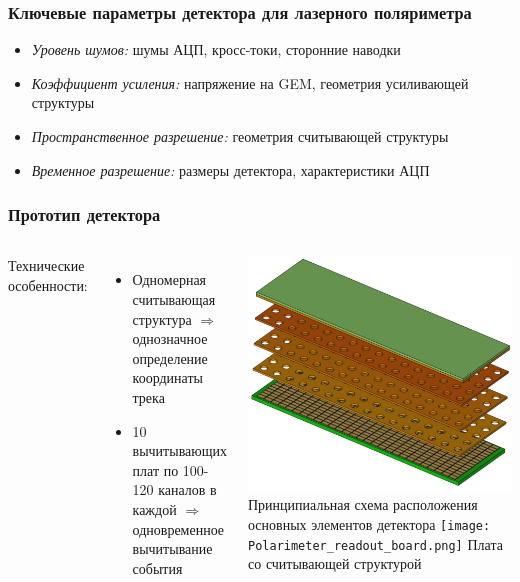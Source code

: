 \documentclass[14pt]{beamer}
\begin{document}
\begin{frame}[t]
\frametitle{Ключевые параметры детектора для лазерного поляриметра}
		\begin{itemize}
				\item \textit{Уровень шумов:} шумы АЦП, кросс-токи, сторонние наводки
				\item  \textit{Коэффициент усиления:} напряжение на GEM, геометрия усиливающей структуры
				\item  \textit{Пространственное разрешение:} геометрия считывающей структуры 
				\item  \textit{Временное разрешение:} размеры детектора, характеристики АЦП
		\end{itemize}
\end{frame}


\begin{frame}[t]
\frametitle{Прототип детектора}
\vspace{0pt}
\begin{columns}
	Технические особенности:
	\begin{minipage}[t][1\textheight]{\linewidth}
		\small{\begin{itemize}
				\item Одномерная считывающая структура $\Rightarrow$ однозначное определение координаты трека
				\item 10 вычитывающих плат по 100-120 каналов в каждой $\Rightarrow$ одновременное вычитывание события
			
				
		\end{itemize}}
	\end{minipage}%
	\begin{minipage}[t][1\textheight]{\linewidth}
		\centering
		\includegraphics[width=0.8\linewidth, height = 0.4\textheight]{GEM_model.pdf}
		\newline \tiny{Принципиальная схема расположения основных элементов детектора}
		\texttt{[image: Polarimeter\_readout\_board.png]} 
		\newline \tiny{Плата со считывающей структурой}
	\end{minipage}%
\end{columns}
\end{frame}
\end{document}
